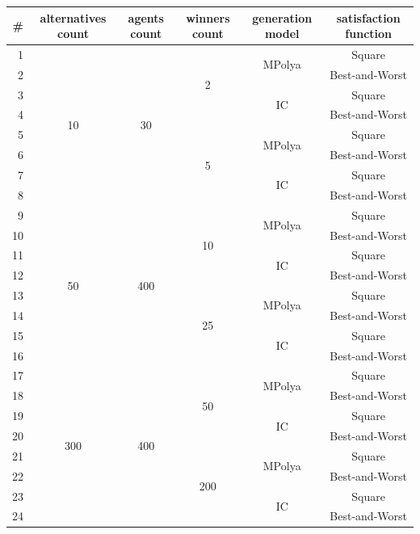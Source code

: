 \begin{tabular}{r | c | c | c | c | c |}
	\# & alternatives count & agents count & winners count & generation model & satisfaction function \\
	\hline
	1 & \multirow{8}{*}{10} & \multirow{8}{*}{30} & \multirow{4}{*}{2} & \multirow{2}{*}{MPolya} & Square \\
	2 & & & & & Best-and-Worst \\
	\cline{5-6}
	3 & & & & \multirow{2}{*}{IC} & Square \\
	4 & & & & & Best-and-Worst \\
	\cline{4-6}
	5 & & & \multirow{4}{*}{5} & \multirow{2}{*}{MPolya} & Square \\
	6 & & & & & Best-and-Worst \\
	\cline{5-6}
	7 & & & & \multirow{2}{*}{IC} & Square \\
	8 & & & & & Best-and-Worst \\
	\hline
	9 & \multirow{8}{*}{50} & \multirow{8}{*}{400} & \multirow{4}{*}{10} & \multirow{2}{*}{MPolya} & Square \\
	10 & & & & & Best-and-Worst \\
	\cline{5-6}
	11 & & & & \multirow{2}{*}{IC} & Square \\
	12 & & & & & Best-and-Worst \\
	\cline{4-6}
	13 & & & \multirow{4}{*}{25} & \multirow{2}{*}{MPolya} & Square \\
	14 & & & & & Best-and-Worst \\
	\cline{5-6}
	15 & & & & \multirow{2}{*}{IC} & Square \\
	16 & & & & & Best-and-Worst \\
	\hline
	17 & \multirow{8}{*}{300} & \multirow{8}{*}{400} & \multirow{4}{*}{50} & \multirow{2}{*}{MPolya} & Square \\
	18 & & & & & Best-and-Worst \\
	\cline{5-6}
	19 & & & & \multirow{2}{*}{IC} & Square \\
	20 & & & & & Best-and-Worst \\
	\cline{4-6}
	21 & & & \multirow{4}{*}{200} & \multirow{2}{*}{MPolya} & Square \\
	22 & & & & & Best-and-Worst \\
	\cline{5-6}
	23 & & & & \multirow{2}{*}{IC} & Square \\
	24 & & & & & Best-and-Worst \\
	\hline
\end{tabular}
\\
\vspace{16pt}

